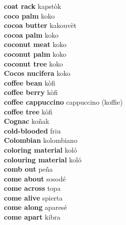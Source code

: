 \textbf{ coat rack  } kapstòk \\
\textbf{ coco palm  } koko \\
\textbf{ cocoa butter  } kakouvèt \\
\textbf{ cocoa palm  } koko \\
\textbf{ coconut meat  } koko \\
\textbf{ coconut palm  } koko \\
\textbf{ coconut tree  } koko \\
\textbf{ Cocos nucifera  } koko \\
\textbf{ coffee bean  } kòfi \\
\textbf{ coffee berry  } kòfi \\
\textbf{ coffee cappuccino  } cappuccino (koffie) \\
\textbf{ coffee tree  } kòfi \\
\textbf{ Cognac  } koñak \\
\textbf{ cold-blooded  } friu \\
\textbf{ Colombian  } kolombiano \\
\textbf{ coloring material  } koló \\
\textbf{ colouring material  } koló \\
\textbf{ comb out  } peña \\
\textbf{ come about  } sosodé \\
\textbf{ come across  } topa \\
\textbf{ come alive  } spierta \\
\textbf{ come along  } aparesé \\
\textbf{ come apart  } kibra \\
